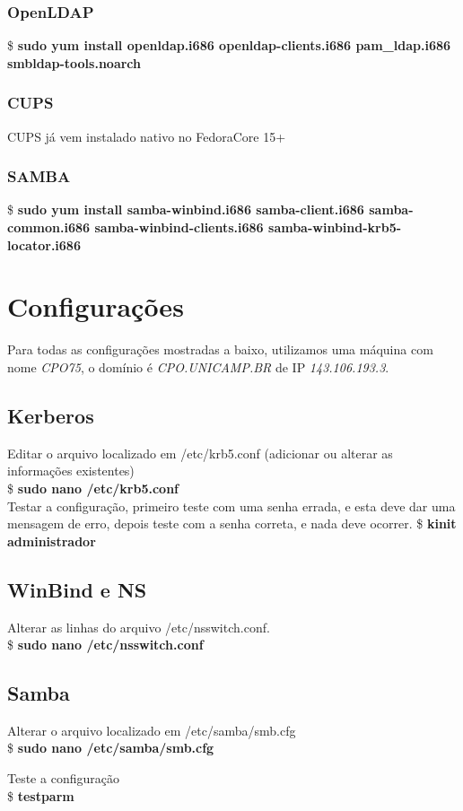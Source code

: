 \documentclass[a4paper,10pt]{article}
\begin{document}
\subsubsection{OpenLDAP}
\$  \textbf{sudo yum install openldap.i686 openldap-clients.i686  pam\_ldap.i686 smbldap-tools.noarch}
\subsubsection{CUPS}
CUPS já vem instalado nativo no FedoraCore 15+
\subsubsection{SAMBA}
\$  \textbf{sudo yum install samba-winbind.i686 samba-client.i686 samba-common.i686 samba-winbind-clients.i686 samba-winbind-krb5-locator.i686}
\section{Configurações}
Para todas as configurações mostradas a baixo, utilizamos uma máquina com nome \emph{CPO75}, o domínio é \emph{CPO.UNICAMP.BR} de IP \emph{143.106.193.3}.
\subsection{Kerberos}
Editar o arquivo localizado em /etc/krb5.conf (adicionar ou alterar as informações existentes)\\
\$ \textbf{sudo nano /etc/krb5.conf}
\\

Testar a configuração, primeiro teste com uma senha errada, e esta deve dar uma mensagem de erro, depois teste com a senha correta, e nada deve ocorrer.
\$ \textbf{kinit administrador}

\subsection{WinBind e NS}
Alterar as linhas do arquivo /etc/nsswitch.conf.\\
\$ \textbf{sudo nano /etc/nsswitch.conf}\\

\subsection{Samba}
Alterar o arquivo localizado em /etc/samba/smb.cfg\\
\$ \textbf{sudo nano /etc/samba/smb.cfg}

Teste a configuração\\
\$ \textbf{testparm}
\end{document}
